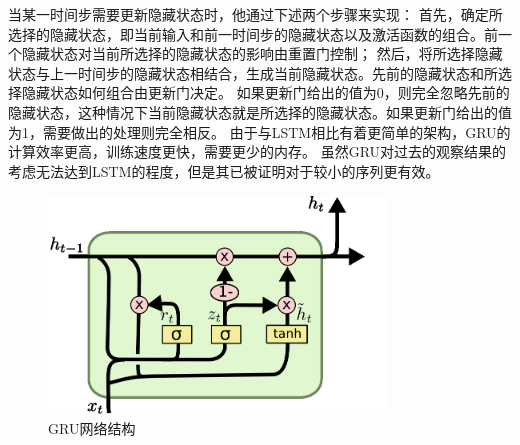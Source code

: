 \documentclass[]{ctexart}
\begin{document}
当某一时间步需要更新隐藏状态时，他通过下述两个步骤来实现：
首先，确定所选择的隐藏状态，即当前输入和前一时间步的隐藏状态以及激活函数的组合。前一个隐藏状态对当前所选择的隐藏状态的影响由重置门控制；
然后，将所选择隐藏状态与上一时间步的隐藏状态相结合，生成当前隐藏状态。先前的隐藏状态和所选择隐藏状态如何组合由更新门决定。
如果更新门给出的值为0，则完全忽略先前的隐藏状态，这种情况下当前隐藏状态就是所选择的隐藏状态。如果更新门给出的值为1，需要做出的处理则完全相反。
由于与LSTM相比有着更简单的架构，GRU的计算效率更高，训练速度更快，需要更少的内存。
虽然GRU对过去的观察结果的考虑无法达到LSTM的程度，但是其已被证明对于较小的序列更有效。
\begin{figure}[htb]
  \centering
  \includegraphics[width=0.8\textwidth]{asset/a_gru.png}
  \caption{GRU网络结构}
  \label{gru}
\end{figure}
\end{document}
